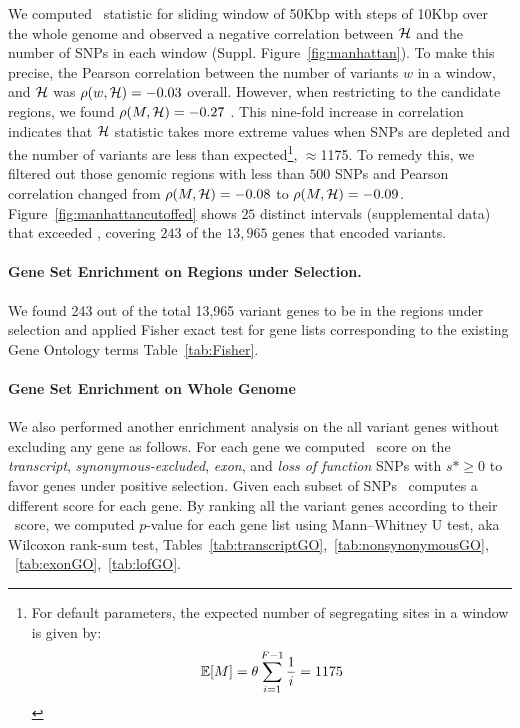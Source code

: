 \documentclass[11pt]{article}
\def\comale{\text{{\sc Comale}}}
\begin{document}
We computed \comale\ statistic for sliding window of 50Kbp with steps
of 10Kbp over the whole genome and observed a negative correlation
between ${\cal H}$ and the number of SNPs in each window
(Suppl. Figure~\ref{fig:manhattan}). To make this precise, the Pearson
correlation between the number of variants $w$ in a window, and ${\cal H}$
was $\rho(w,{\cal H})=-0.03$ overall. However, when restricting to the
candidate regions, we found $\rho(M,{\cal H})=-0.27$ . This nine-fold
increase in correlation indicates that ${\cal H}$ statistic takes more
extreme values when SNPs are depleted and the number of variants are
less than expected\footnote{ For
	default parameters, the expected number of segregating sites in a
	window is given by:
$${\mathbb E}[M]=\theta \sum_{i=1}^{F-1}\frac{1}{i}=1175 $$}, $\approx$1175.  
To remedy this, we filtered out
those genomic regions with less than $500$ SNPs and Pearson
correlation changed from $\rho(M,{\cal H})=-0.08$ to
$\rho(M,{\cal H})=-0.09$. Figure~\ref{fig:manhattancutoffed} shows $25$
distinct intervals (supplemental data) that exceeded , covering $243$ of
the $13,965$ genes that encoded variants.

\paragraph{Gene Set Enrichment on Regions under Selection.}
We found 243 out of the total 13,965 variant genes to be in the regions under 
selection and applied Fisher exact test for gene lists corresponding to the 
existing Gene Ontology terms Table~\ref{tab:Fisher}.


\paragraph{Gene Set Enrichment on Whole Genome} 
We also performed another enrichment analysis on the all variant genes without 
excluding any gene as follows. For each gene we computed \comale\ score on the 
\emph{transcript}, \emph{synonymous-excluded}, \emph{exon}, and \emph{loss of 
function}
 SNPs with $s*\ge0$ to favor genes under positive selection. Given each subset 
 of SNPs \comale\ computes a different score for each gene. By ranking all the 
 variant genes according to their \comale\ score, we computed $p$-value for each 
 gene list using Mann–Whitney U test, aka Wilcoxon rank-sum test, 
 Tables~\ref{tab:transcriptGO},~\ref{tab:nonsynonymousGO},
~\ref{tab:exonGO},~\ref{tab:lofGO}.
\end{document}
